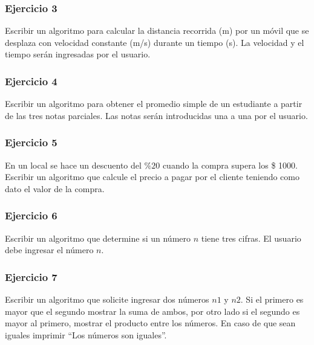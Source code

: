 \subsubsection{Ejercicio 3}
Escribir un algoritmo para calcular la distancia recorrida (m) por un móvil que se desplaza con velocidad constante (m/s) durante un tiempo (s).
La velocidad y el tiempo serán ingresadas por el usuario.

\subsubsection{Ejercicio 4}
Escribir un algoritmo para obtener el promedio simple de un estudiante a partir de las tres notas parciales.
Las notas serán introducidas una a una por el usuario.

\subsubsection{Ejercicio 5}
En un local se hace un descuento del $\mathrm{\%20}$ cuando la compra supera los \$ 1000. Escribir un algoritmo que calcule el precio a pagar por el cliente
teniendo como dato el valor de la compra.

\subsubsection{Ejercicio 6}
Escribir un algoritmo que determine si un número $n$ tiene tres cifras. El usuario debe ingresar el número $n$.

\subsubsection{Ejercicio 7}
Escribir un algoritmo que solicite ingresar dos números $n1$ y $n2$. Si el primero es mayor que el segundo mostrar la suma de ambos, por otro lado si el segundo es mayor al primero, mostrar el producto entre los números. En caso de que sean iguales imprimir ``Los números son iguales''.

